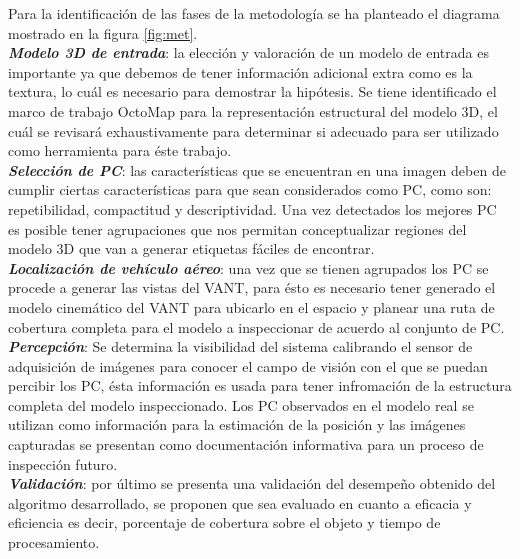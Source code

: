\documentclass[]{report}
\begin{document}
Para la identificación de las fases de la metodología se ha planteado el diagrama mostrado en la figura \ref{fig:met}.\\
\textbf{\textit{Modelo 3D de entrada}}: la elección y valoración de un modelo de entrada es importante ya que debemos de tener información adicional extra como es la textura, lo cuál es necesario para demostrar la hipótesis. Se tiene identificado el marco de trabajo OctoMap para la representación estructural del modelo 3D, el cuál se revisará exhaustivamente para determinar si adecuado para ser utilizado como herramienta para éste trabajo.\\
\textbf{\textit{Selección de PC}}: las características que se encuentran en una imagen deben de cumplir ciertas características para que sean considerados como PC, como son: repetibilidad, compactitud y descriptividad. Una vez detectados los mejores PC es posible tener agrupaciones que nos permitan conceptualizar regiones del modelo 3D que van a generar etiquetas fáciles de encontrar.  \\
\textbf{\textit{Localización de vehículo aéreo}}: una vez que se tienen agrupados los PC se procede a generar las vistas del VANT, para ésto es necesario tener generado el modelo cinemático del VANT para ubicarlo en el espacio y planear una ruta de cobertura completa para el modelo a inspeccionar de acuerdo al conjunto de PC.\\
\textbf{\textit{Percepción}}: Se determina la visibilidad del sistema calibrando el sensor de adquisición de imágenes para conocer el campo de visión con el que se puedan percibir los PC,  ésta información es usada para tener infromación de la estructura completa del modelo inspeccionado. Los PC observados en el modelo real se utilizan como información para la estimación de la posición y las imágenes capturadas se presentan como documentación informativa para un proceso de inspección futuro.\\
\textbf{\textit{Validación}}: por último se presenta una validación del desempeño obtenido del algoritmo desarrollado, se proponen que sea evaluado en cuanto a eficacia y eficiencia es decir, porcentaje de cobertura sobre el objeto y tiempo de procesamiento.\\
\end{document}
